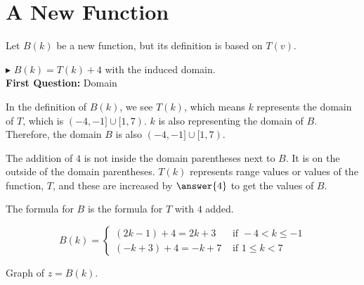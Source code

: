\documentclass{ximera}
\begin{document}
\section{A New Function}

Let $B(k)$ be a new function, but its definition is based on $T(v)$.


$\blacktriangleright$ $B(k) = T(k)+4$ with the induced domain. \\


\textbf{First Question:} Domain

In the definition of $B(k)$, we see $T(k)$, which means $k$ represents the domain of $T$, which is $(-4,-1] \cup [1,7)$. $k$ is also representing the domain of $B$.  Therefore, the domain $B$ is also $(-4,-1] \cup [1,7)$.


The addition of $4$ is not inside the domain parentheses next to $B$.  It is on the outside of the domain parentheses. $T(k)$ represents range values or values of the function, $T$, and these are increased by $\answer{4}$ to get the values of $B$.





The formula for $B$ is the formula for $T$ with $4$ added.




\[
B(k) = 
\begin{cases}
  (2k-1)+4 = 2k+3 & \text{ if }  -4 < k \leq -1 \\
  (-k+3)+4 = -k+7 & \text{ if } 1 \leq k < 7
\end{cases}
\]








Graph of $z = B(k)$.
\begin{image}
\end{image}
\end{document}
